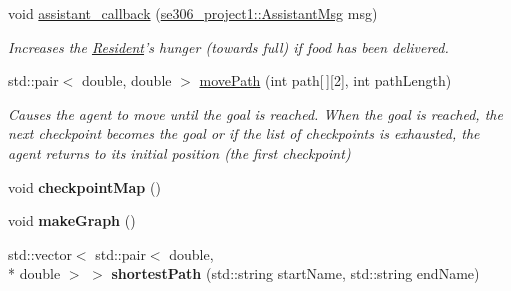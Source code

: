 \begin{DoxyCompactItemize}
\item 
void \hyperlink{classResident_aa715d491e917de6f621593f0d1f01bd6}{assistant\-\_\-callback} (\hyperlink{structse306__project1_1_1AssistantMsg__}{se306\-\_\-project1\-::\-Assistant\-Msg} msg)
\begin{DoxyCompactList}\small\item\em Increases the \hyperlink{classResident}{Resident}'s hunger (towards full) if food has been delivered. \end{DoxyCompactList}\item 
std\-::pair$<$ double, double $>$ \hyperlink{classResident_a0cfe1d9b185beed7d3438157cc69db05}{move\-Path} (int path\mbox{[}$\,$\mbox{]}\mbox{[}2\mbox{]}, int path\-Length)
\begin{DoxyCompactList}\small\item\em Causes the agent to move until the goal is reached. When the goal is reached, the next checkpoint becomes the goal or if the list of checkpoints is exhausted, the agent returns to its initial position (the first checkpoint) \end{DoxyCompactList}\item 
\hypertarget{classResident_a15bb8540e201651ba2182880c5e8e00d}{void {\bfseries checkpoint\-Map} ()}\label{classResident_a15bb8540e201651ba2182880c5e8e00d}

\item 
\hypertarget{classResident_a356d42dfaccea84de8c020b447b307c0}{void {\bfseries make\-Graph} ()}\label{classResident_a356d42dfaccea84de8c020b447b307c0}

\item 
\hypertarget{classResident_af0d9900521219f2b28425f492a51d093}{std\-::vector$<$ std\-::pair$<$ double, \\*
double $>$ $>$ {\bfseries shortest\-Path} (std\-::string start\-Name, std\-::string end\-Name)}\label{classResident_af0d9900521219f2b28425f492a51d093}

\end{DoxyCompactItemize}
